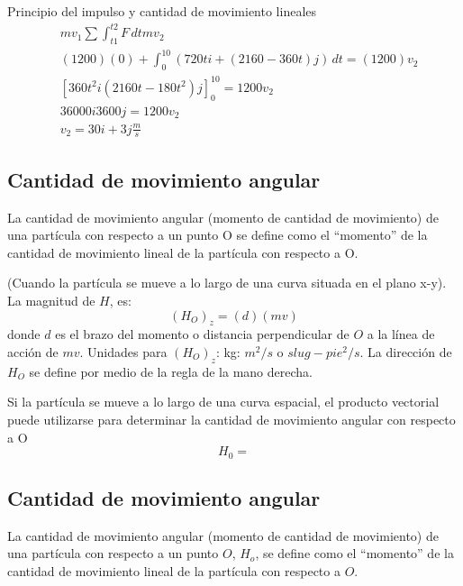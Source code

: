 Principio del impulso y cantidad de movimiento lineales
\begin{align*}
    &mv_1 \sum \int_{t1}^{t2}F\,dt mv_2\\
    &(1200)(0) +\int_0^{10}\left(720ti +(2160 - 360t)j\right)\,dt =(1200)v_2\\
    &\left[360t^2i (2160t - 180t^2)j\right]_0^{10} =1200v_2\\ 
    &36000i 3600j = 1200v_2\\
    &v_{2} =30i +3j\frac{m}{s}
\end{align*}

\subsection{Cantidad de movimiento angular}

La cantidad de movimiento angular (momento de cantidad de movimiento) de una partícula con respecto a un punto O se define como el ``momento'' de la cantidad de movimiento lineal de la partícula con respecto a O.

\begin{definition}
    (Cuando la partícula se mueve a lo largo de una curva situada en el plano x-y). La magnitud de $H$, es:
\begin{equation}
    (H_O)_z = (d)(mv)
\end{equation}
donde $d$ es el brazo del momento o distancia perpendicular de $O$ a la línea de acción de $mv$. Unidades para $(H_O)_z$: kg: $m^2/s$ o $slug-pie^2/s$. La dirección de $H_O$ se define por medio de la regla de la mano derecha.
\end{definition}

\begin{definition}
    Si la partícula se mueve a lo largo de una curva espacial, el producto vectorial puede utilizarse para determinar la cantidad de movimiento angular con respecto a O
    \begin{equation}
        H_0 = 
    \end{equation}
\end{definition}
\subsection{Cantidad de movimiento angular}

La cantidad de movimiento angular (momento de cantidad de movimiento) de una partícula con respecto a un punto $O$, $H_o$, se define como el ``momento'' de la cantidad de movimiento lineal de la partícula con respecto a $O$.

